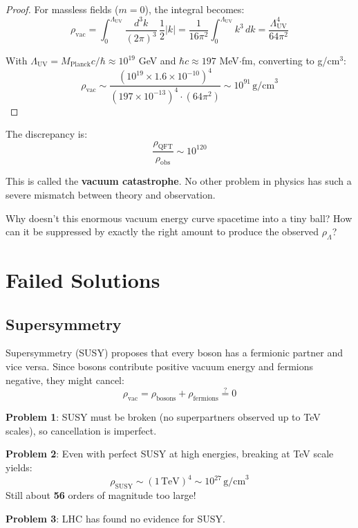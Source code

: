 \begin{proof}
For massless fields ($m = 0$), the integral becomes:
\begin{equation}
\rho_{\text{vac}} = \int_0^{\Lambda_{\text{UV}}} \frac{d^3k}{(2\pi)^3} \, \frac{1}{2} |k| = \frac{1}{16\pi^2} \int_0^{\Lambda_{\text{UV}}} k^3 \, dk = \frac{\Lambda_{\text{UV}}^4}{64\pi^2}
\end{equation}

With $\Lambda_{\text{UV}} = M_{\text{Planck}} c / \hbar \approx 10^{19}$ GeV and $\hbar c \approx 197$ MeV$\cdot$fm, converting to g/cm$^3$:
\begin{equation}
\rho_{\text{vac}} \sim \frac{(10^{19} \times 1.6 \times 10^{-10})^4}{(197 \times 10^{-13})^4 \cdot (64\pi^2)} \sim 10^{91} \, \text{g/cm}^3
\end{equation}
\end{proof}

\begin{keyidea}
The discrepancy is:
\begin{equation}
\boxed{\frac{\rho_{\text{QFT}}}{\rho_{\text{obs}}} \sim 10^{120}}
\end{equation}

This is called the \textbf{vacuum catastrophe}. No other problem in physics has such a severe mismatch between theory and observation.

Why doesn't this enormous vacuum energy curve spacetime into a tiny ball? How can it be suppressed by exactly the right amount to produce the observed $\rho_\Lambda$?
\end{keyidea}

\section{Failed Solutions}

\subsection{Supersymmetry}

\begin{level2}
Supersymmetry (SUSY)\cite{wess1974,nilles1984} proposes that every boson has a fermionic partner and vice versa. Since bosons contribute positive vacuum energy and fermions negative, they might cancel:
\begin{equation}
\rho_{\text{vac}} = \rho_{\text{bosons}} + \rho_{\text{fermions}} \stackrel{?}{=} 0
\end{equation}

\textbf{Problem 1}: SUSY must be broken (no superpartners observed up to TeV scales), so cancellation is imperfect.

\textbf{Problem 2}: Even with perfect SUSY at high energies, breaking at TeV scale yields:
\begin{equation}
\rho_{\text{SUSY}} \sim (1 \, \text{TeV})^4 \sim 10^{27} \, \text{g/cm}^3
\end{equation}
Still about \textbf{56} orders of magnitude too large!

\textbf{Problem 3}: LHC has found no evidence for SUSY\cite{atlas2023,cms2023}.
\end{level2}

